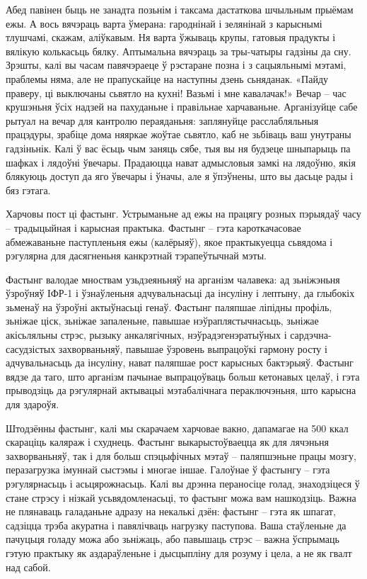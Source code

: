 Абед павінен быць не занадта позьнім і таксама дастаткова шчыльным прыёмам ежы. А вось вячэраць варта ўмерана: гароднінай і зелянінай з карыснымі тлушчамі, скажам, аліўкавым. Ня варта ўжываць крупы, гатовыя прадукты і вялікую колькасьць бялку. Аптымальна вячэраць за тры-чатыры гадзіны да сну. Зрэшты, калі вы часам павячэраеце ў рэстаране позна і з сацыяльнымі мэтамі, праблемы няма, але не прапускайце на наступны дзень сьняданак. «Пайду праверу, ці выключаны сьвятло на кухні! Вазьмі і мне кавалачак!» Вечар – час крушэньня ўсіх надзей на пахуданьне і правільнае харчаваньне. Арганізуйце сабе рытуал на вечар для кантролю пераяданьня: заплянуйце расслабляльныя працэдуры, зрабіце дома няяркае жоўтае сьвятло, каб не зьбіваць ваш унутраны гадзіньнік. Калі ў вас ёсьць чым заняць сябе, тыя вы ня будзеце шныпарыць па шафках і лядоўні ўвечары. Прадаюцца нават адмысловыя замкі на лядоўню, якія блякуюць доступ да яго ўвечары і ўначы, але я ўпэўнены, што вы дасьце рады і бяз гэтага.

Харчовы пост ці фастынг. Устрыманьне ад ежы на працягу розных пэрыядаў часу – традыцыйная і карысная практыка. Фастынг – гэта кароткачасовае абмежаваньне паступленьня ежы (калёрыяў), якое практыкуецца сьвядома і рэгулярна для дасягненьня канкрэтнай тэрапеўтычнай мэты.

Фастынг валодае мноствам узьдзеяньняў на арганізм чалавека: ад зьніжэньня ўзроўняў ІФР-1 і ўзнаўленьня адчувальнасьці да інсуліну і лептыну, да глыбокіх зьменаў на ўзроўні актыўнасьці генаў. Фастынг паляпшае ліпідны профіль, зьніжае ціск, зьніжае запаленьне, павышае нэўраплястычнасьць, зьніжае акісьляльны стрэс, рызыку анкалягічных, нэўрадэгенэратыўных і сардэчна-сасудзістых захворваньняў, павышае ўзровень выпрацоўкі гармону росту і адчувальнасьць да інсуліну, нават паляпшае рост карысных бактэрыяў. Фастынг вядзе да таго, што арганізм пачынае выпрацоўваць больш кетонавых целаў, і гэта прыводзіць да рэгулярнай актывацыі мэтабалічнага пераключэньня, што карысна для здароўя.

Штодзённы фастынг, калі мы скарачаем харчовае вакно, дапамагае на 500 ккал скараціць каляраж і схуднець. Фастынг выкарыстоўваецца як для лячэньня захворваньняў, так і для больш спэцыфічных мэтаў – паляпшэньне працы мозгу, перазагрузка імуннай сыстэмы і многае іншае. Галоўнае ў фастынгу – гэта рэгулярнасьць і асьцярожнасьць. Калі вы дрэнна пераносіце голад, знаходзіцеся ў стане стрэсу і нізкай усьвядомленасьці, то фастынг можа вам нашкодзіць. Важна не плянаваць галаданьне адразу на некалькі дзён: фастынг – гэта як шпагат, садзіцца трэба акуратна і павялічваць нагрузку паступова. Ваша стаўленьне да пачуцьця голаду можа або зьніжаць, або павышаць стрэс – важна ўспрымаць гэтую практыку як аздараўленьне і дысцыпліну для розуму і цела, а не як гвалт над сабой.

